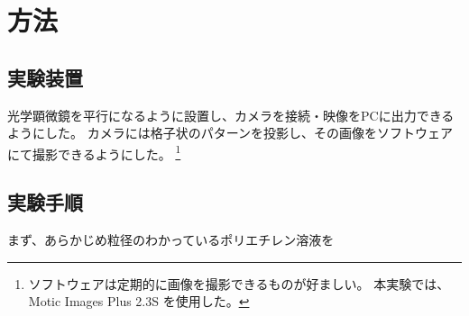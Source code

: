 \documentclass[../../../main]{subfiles}
\begin{document}
\section{方法}

\subsection{実験装置}
光学顕微鏡を平行になるように設置し、カメラを接続・映像をPCに出力できるようにした。
カメラには格子状のパターンを投影し、その画像をソフトウェアにて撮影できるようにした。
\footnote{
    ソフトウェアは定期的に画像を撮影できるものが好ましい。
    本実験では、 Motic Images Plus 2.3S を使用した。
}

\subsection{実験手順}
まず、あらかじめ粒径のわかっているポリエチレン溶液を
\end{document}
